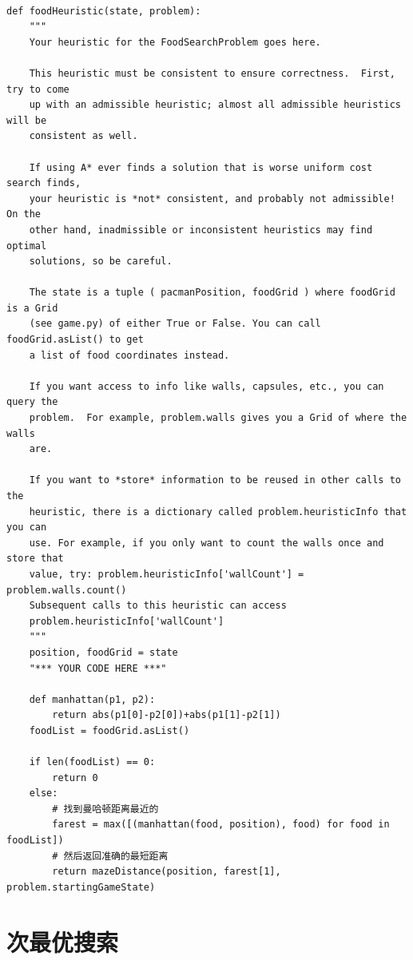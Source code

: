 \documentclass[forprint]{WHUBachelor}
\begin{document}
\begin{verbatim}

def foodHeuristic(state, problem):
    """
    Your heuristic for the FoodSearchProblem goes here.

    This heuristic must be consistent to ensure correctness.  First, try to come
    up with an admissible heuristic; almost all admissible heuristics will be
    consistent as well.

    If using A* ever finds a solution that is worse uniform cost search finds,
    your heuristic is *not* consistent, and probably not admissible!  On the
    other hand, inadmissible or inconsistent heuristics may find optimal
    solutions, so be careful.

    The state is a tuple ( pacmanPosition, foodGrid ) where foodGrid is a Grid
    (see game.py) of either True or False. You can call foodGrid.asList() to get
    a list of food coordinates instead.

    If you want access to info like walls, capsules, etc., you can query the
    problem.  For example, problem.walls gives you a Grid of where the walls
    are.

    If you want to *store* information to be reused in other calls to the
    heuristic, there is a dictionary called problem.heuristicInfo that you can
    use. For example, if you only want to count the walls once and store that
    value, try: problem.heuristicInfo['wallCount'] = problem.walls.count()
    Subsequent calls to this heuristic can access
    problem.heuristicInfo['wallCount']
    """
    position, foodGrid = state
    "*** YOUR CODE HERE ***"

    def manhattan(p1, p2):
        return abs(p1[0]-p2[0])+abs(p1[1]-p2[1])
    foodList = foodGrid.asList()

    if len(foodList) == 0:
        return 0
    else:
        # 找到曼哈顿距离最近的
        farest = max([(manhattan(food, position), food) for food in foodList])
        # 然后返回准确的最短距离
        return mazeDistance(position, farest[1], problem.startingGameState)

\end{verbatim}

\section{次最优搜索}
\end{document}
